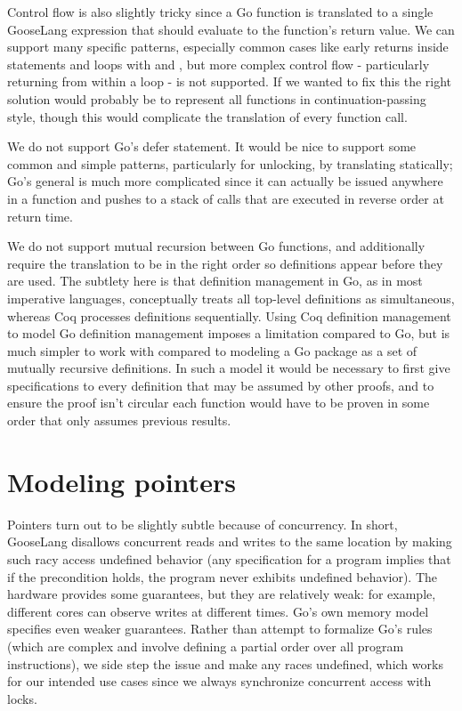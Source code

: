 Control flow is also slightly tricky since a Go function is translated
to a single GooseLang expression that should evaluate to the function's
return value. We can support many specific patterns, especially common
cases like early returns inside  statements and loops with
 and , but more complex control flow -
particularly returning from within a loop - is not supported. If we
wanted to fix this the right solution would probably be to represent all
functions in continuation-passing style, though this would complicate
the translation of every function call.

We do not support Go's defer statement. It would be nice to support some
common and simple patterns, particularly for unlocking, by translating
 statically; Go's general  is much more
complicated since it can actually be issued anywhere in a function and
pushes to a stack of calls that are executed in reverse order at return
time.

We do not support mutual recursion between Go functions, and
additionally require the translation to be in the right order so
definitions appear before they are used. The subtlety here is that
definition management in Go, as in most imperative languages,
conceptually treats all top-level definitions as simultaneous, whereas
Coq processes definitions sequentially. Using Coq definition management
to model Go definition management imposes a limitation compared to Go,
but is much simpler to work with compared to modeling a Go package as a
set of mutually recursive definitions. In such a model it would be
necessary to first give specifications to every definition that may be
assumed by other proofs, and to ensure the proof isn't circular each
function would have to be proven in some order that only assumes
previous results.

\section{Modeling pointers}

Pointers turn out to be slightly subtle because of concurrency. In
short, GooseLang disallows concurrent reads and writes to the same
location by making such racy access undefined behavior (any
specification for a program implies that if the precondition holds, the
program never exhibits undefined behavior). The hardware provides some
guarantees, but they are relatively weak: for example, different cores
can observe writes at different times. Go's own memory model specifies
even weaker guarantees. Rather than attempt to formalize Go's rules
(which are complex and involve defining a partial order over all program
instructions), we side step the issue and make any races undefined,
which works for our intended use cases since we always synchronize
concurrent access with locks.

